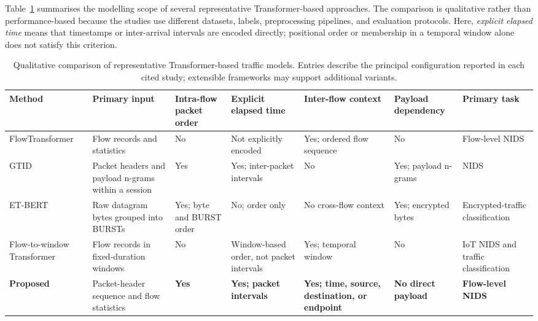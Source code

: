 \documentclass[11pt,fleqn]{report}
\begin{document}
Table~\ref{tab:rw_model_comparison} summarises the modelling scope of several representative Transformer-based approaches. The comparison is qualitative rather than performance-based because the studies use different datasets, labels, preprocessing pipelines, and evaluation protocols. Here, \emph{explicit elapsed time} means that timestamps or inter-arrival intervals are encoded directly; positional order or membership in a temporal window alone does not satisfy this criterion.

\begin{table}[H]
\centering
\caption{Qualitative comparison of representative Transformer-based traffic models. Entries describe the principal configuration reported in each cited study; extensible frameworks may support additional variants.}
\label{tab:rw_model_comparison}
\scriptsize
\setlength{\tabcolsep}{2pt}
\renewcommand{\arraystretch}{1.22}
\begin{tabular}{@{}p{1.85cm}p{2.65cm}p{1.55cm}p{2.15cm}p{2.45cm}p{1.85cm}p{1.85cm}@{}}
\toprule
\textbf{Method} & \textbf{Primary input} & \textbf{Intra-flow packet order} & \textbf{Explicit elapsed time} & \textbf{Inter-flow context} & \textbf{Payload dependency} & \textbf{Primary task} \\
\midrule
FlowTransformer \cite{Manocchio2024FlowTransformer} & Flow records and statistics & No &
Not explicitly encoded & Yes; ordered flow sequence & No & Flow-level NIDS \\

GTID \cite{Han2023GTID} & Packet headers and payload n-grams within a session &
Yes & Yes; inter-packet intervals & No & Yes; payload n-grams & NIDS \\

ET-BERT \cite{Lin2022ETBERT} & Raw datagram bytes grouped into BURSTs & Yes; byte and BURST order & No; order only & No cross-flow context & Yes; encrypted bytes & Encrypted-traffic classification \\

Flow-to-window Transformer \cite{MartinReizabal2026FlowWindow} & Flow records in fixed-duration windows & No & Window-based order, not packet intervals & Yes; temporal window & No & IoT NIDS and traffic classification \\

\textbf{Proposed} & Packet-header sequence and flow statistics & \textbf{Yes} & \textbf{Yes; packet intervals} & \textbf{Yes; time, source, destination, or endpoint} & \textbf{No direct payload} & \textbf{Flow-level NIDS} \\
\bottomrule
\end{tabular}
\end{table}
\end{document}
